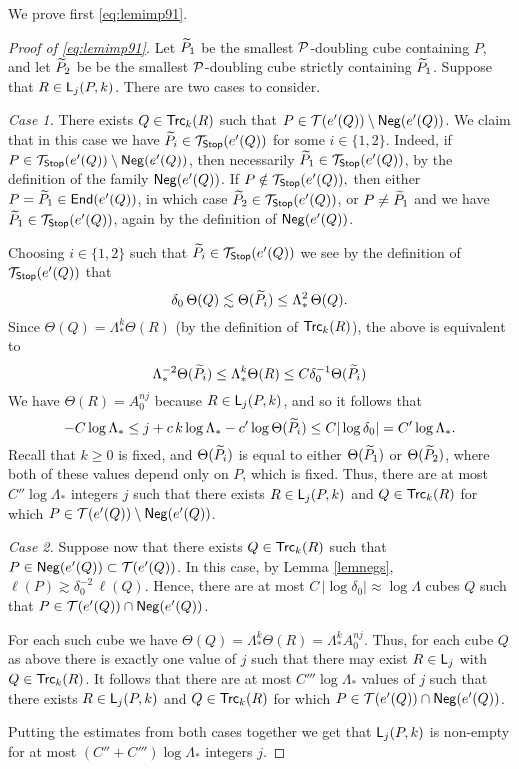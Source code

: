 We prove first \eqref{eq:lemimp91}.
\begin{proof}[Proof of \eqref{eq:lemimp91}]
	Let ${\widetilde{P}}_1$ be the smallest ${\mathcal P}$-doubling cube containing $P$, and let ${\widetilde{P}}_2$ be be the smallest ${\mathcal P}$-doubling cube strictly containing ${\widetilde{P}}_1$. Suppose that  $R\in{\mathsf{L}}_j(P,k)$. There are two cases to consider.
	\vv
	
	\emph{Case 1.} There exists $Q\in{\mathsf{Trc}}_k(R)$ such that $P\in{\mathcal T}(e'(Q))\setminus{\mathsf{Neg}}(e'(Q))$. We claim that in this case we have ${\widetilde{P}}_i\in {\mathcal T}_{\mathsf {Stop}}(e'(Q))$ for some $i\in\{1,2\}$. Indeed, if $P\in{\mathcal T}_{\mathsf {Stop}}(e'(Q))\setminus{\mathsf{Neg}}(e'(Q))$, then  necessarily ${\widetilde{P}}_1\in {\mathcal T}_{\mathsf {Stop}}(e'(Q))$, by the definition of
	the family ${\mathsf{Neg}}(e'(Q))$. If $P\notin{\mathcal T}_{\mathsf {Stop}}(e'(Q)),$ then either $P={\widetilde{P}}_1\in{\mathsf{End}}(e'(Q))$, in which case ${\widetilde{P}}_2\in {\mathcal T}_{\mathsf {Stop}}(e'(Q))$, or $P\neq {\widetilde{P}}_1$ and we have ${\widetilde{P}}_1\in {\mathcal T}_{\mathsf {Stop}}(e'(Q))$, again by the definition of ${\mathsf{Neg}}(e'(Q))$.
	
	Choosing $i\in\{1,2\}$ such that ${\widetilde{P}}_i\in {\mathcal T}_{\mathsf {Stop}}(e'(Q))$ we see by the definition of ${\mathcal T}_{\mathsf {Stop}}(e'(Q))$ that
	$$\delta_0\,\Theta(Q)\lesssim \Theta({\widetilde{P}}_i)\leq \Lambda_*^2\,\Theta(Q).$$
	Since $\Theta(Q)=\Lambda_*^k\Theta(R)$ (by the definition of ${\mathsf{Trc}}_k(R)$), the above is equivalent to
	\begin{equation*}
		\Lambda_*^{-2}\Theta({\widetilde{P}}_i)\le \Lambda_*^k\Theta(R)\le C\delta_0^{-1}\Theta({\widetilde{P}}_i)
	\end{equation*}
	We have $\Theta(R)=A_0^{nj}$ because $R\in {\mathsf{L}}_j(P,k)$, and so it follows that 
	$$-C\log\Lambda_*\leq j + c\,k\log\Lambda_* - c'\log\Theta({\widetilde{P}}_i)\leq C|\log\delta_0| = C'\log\Lambda_*.$$
	Recall that $k\ge 0$ is fixed, and $\Theta({\widetilde{P}}_i)$ is equal to either $\Theta({\widetilde{P}}_1)$ or $\Theta({\widetilde{P}}_2)$, where both of these values depend only on $P$, which is fixed. Thus, there are at most $C''\log\Lambda_*$ integers $j$ such that there exists  $R\in{\mathsf{L}}_j(P,k)$ and $Q\in{\mathsf{Trc}}_k(R)$ for which $P\in{\mathcal T}(e'(Q))\setminus{\mathsf{Neg}}(e'(Q))$.
	
	\vv
	
	\emph{Case 2.}
	Suppose now that there exists $Q\in{\mathsf{Trc}}_k(R)$ such that $P\in{\mathsf{Neg}}(e'(Q))\subset{\mathcal T}(e'(Q))$.
	In this case, by Lemma \ref{lemnegs}, $\ell(P) \gtrsim \delta_0^{-2}\,\ell(Q)$. Hence, there
	are at most $C\,|\log\delta_0|\approx \log\Lambda$ cubes $Q$ such that 
	$P\in{\mathcal T}(e'(Q))\cap{\mathsf{Neg}}(e'(Q))$. 
	
	For each such cube we have $\Theta(Q)=\Lambda_*^k\Theta(R) = \Lambda_*^k A_0^{nj}$. Thus, for each cube $Q$ as above there is exactly one value of $j$ such that there may exist $R\in{\mathsf{L}}_j$ with $Q\in{\mathsf{Trc}}_k(R)$. It follows that there are at most 
	$C'''\log\Lambda_*$ values of $j$ such that
	there exists $R\in{\mathsf{L}}_j(P,k)$ and $Q\in{\mathsf{Trc}}_k(R)$ for which $P\in{\mathcal T}(e'(Q))\cap{\mathsf{Neg}}(e'(Q))$.
	
	\vv
	Putting the estimates from both cases together we get that ${\mathsf{L}}_j(P,k)$ is non-empty for at most $(C''+C''')\log\Lambda_*$ integers $j$.
\end{proof}

